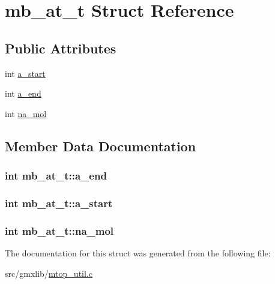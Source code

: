 \hypertarget{structmb__at__t}{\section{mb\-\_\-at\-\_\-t \-Struct \-Reference}
\label{structmb__at__t}
}
\subsection*{\-Public \-Attributes}
\begin{DoxyCompactItemize}
\item 
int \hyperlink{structmb__at__t_a794e53a200c90deaccd32ba001080ab3}{a\-\_\-start}
\item 
int \hyperlink{structmb__at__t_a2e21f7d8cb27593f174c32075f34f970}{a\-\_\-end}
\item 
int \hyperlink{structmb__at__t_a3a9f21a9f31e1228b60545c9e10bb8d9}{na\-\_\-mol}
\end{DoxyCompactItemize}


\subsection{\-Member \-Data \-Documentation}
\hypertarget{structmb__at__t_a2e21f7d8cb27593f174c32075f34f970}{
\subsubsection[{a\-\_\-end}]{\setlength{\rightskip}{0pt plus 5cm}int {\bf mb\-\_\-at\-\_\-t\-::a\-\_\-end}}}\label{structmb__at__t_a2e21f7d8cb27593f174c32075f34f970}
\hypertarget{structmb__at__t_a794e53a200c90deaccd32ba001080ab3}{
\subsubsection[{a\-\_\-start}]{\setlength{\rightskip}{0pt plus 5cm}int {\bf mb\-\_\-at\-\_\-t\-::a\-\_\-start}}}\label{structmb__at__t_a794e53a200c90deaccd32ba001080ab3}
\hypertarget{structmb__at__t_a3a9f21a9f31e1228b60545c9e10bb8d9}{
\subsubsection[{na\-\_\-mol}]{\setlength{\rightskip}{0pt plus 5cm}int {\bf mb\-\_\-at\-\_\-t\-::na\-\_\-mol}}}\label{structmb__at__t_a3a9f21a9f31e1228b60545c9e10bb8d9}


\-The documentation for this struct was generated from the following file\-:\begin{DoxyCompactItemize}
\item 
src/gmxlib/\hyperlink{mtop__util_8c}{mtop\-\_\-util.\-c}\end{DoxyCompactItemize}
